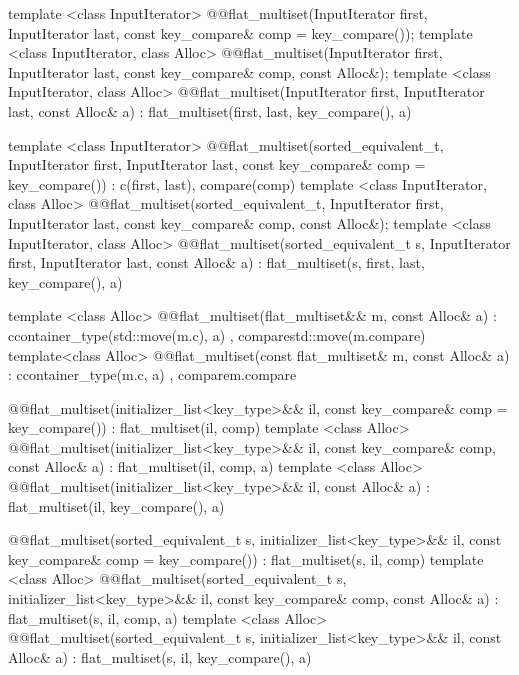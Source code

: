 \begin{codeblock}
{    template <class InputIterator>
      @@flat_multiset(InputIterator first, InputIterator last,
                              const key_compare& comp = key_compare());
    template <class InputIterator, class Alloc>
      @@flat_multiset(InputIterator first, InputIterator last,
                              const key_compare& comp, const Alloc&);
    template <class InputIterator, class Alloc>
      @@flat_multiset(InputIterator first, InputIterator last,
                              const Alloc& a)
        : flat_multiset(first, last, key_compare(), a) { }

    template <class InputIterator>
      @@flat_multiset(sorted_equivalent_t, InputIterator first, InputIterator last,
                              const key_compare& comp = key_compare())
        : c(first, last), compare(comp) { }
    template <class InputIterator, class Alloc>
      @@flat_multiset(sorted_equivalent_t, InputIterator first, InputIterator last,
                              const key_compare& comp, const Alloc&);
    template <class InputIterator, class Alloc>
      @@flat_multiset(sorted_equivalent_t s, InputIterator first, InputIterator last,
                              const Alloc& a)
        : flat_multiset(s, first, last, key_compare(), a) { }

    template <class Alloc>
     @@flat_multiset(flat_multiset&& m, const Alloc& a)
       : c{container_type(std::move(m.c), a)}
       , compare{std::move(m.compare)}
     { }
   template<class Alloc>
     @@flat_multiset(const flat_multiset& m, const Alloc& a)
       : c{container_type(m.c, a)}
       , compare{m.compare}
     { }

    @@flat_multiset(initializer_list<key_type>&& il,
                            const key_compare& comp = key_compare())
      : flat_multiset(il, comp) { }
    template <class Alloc>
      @@flat_multiset(initializer_list<key_type>&& il,
                              const key_compare& comp, const Alloc& a)
        : flat_multiset(il, comp, a) { }
    template <class Alloc>
      @@flat_multiset(initializer_list<key_type>&& il, const Alloc& a)
        : flat_multiset(il, key_compare(), a) { }

    @@flat_multiset(sorted_equivalent_t s, initializer_list<key_type>&& il,
                            const key_compare& comp = key_compare())
        : flat_multiset(s, il, comp) { }
    template <class Alloc>
      @@flat_multiset(sorted_equivalent_t s, initializer_list<key_type>&& il,
                              const key_compare& comp, const Alloc& a)
        : flat_multiset(s, il, comp, a) { }
    template <class Alloc>
      @@flat_multiset(sorted_equivalent_t s, initializer_list<key_type>&& il,
                              const Alloc& a)
        : flat_multiset(s, il, key_compare(), a) { }

}
\end{codeblock}
